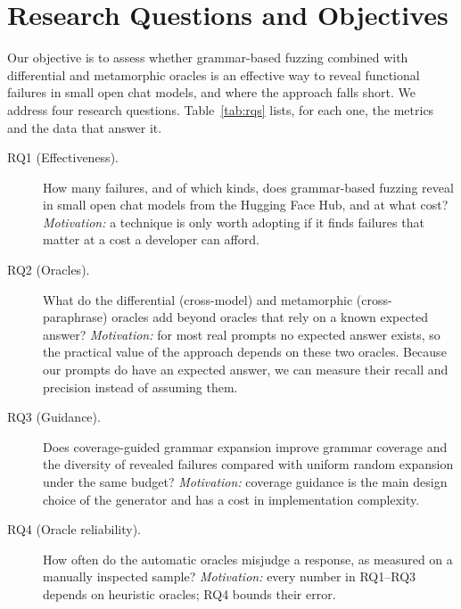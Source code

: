 \section{Research Questions and Objectives}\label{sec:rqs}

Our objective is to assess whether grammar-based fuzzing combined with differential and metamorphic oracles is an effective way to reveal functional failures in small open chat models, and where the approach falls short. We address four research questions. Table~\ref{tab:rqs} lists, for each one, the metrics and the data that answer it.

\begin{description}
  \item[RQ1 (Effectiveness).] How many failures, and of which kinds, does grammar-based fuzzing reveal in small open chat models from the Hugging Face Hub, and at what cost? \emph{Motivation:} a technique is only worth adopting if it finds failures that matter at a cost a developer can afford.
  \item[RQ2 (Oracles).] What do the differential (cross-model) and metamorphic (cross-paraphrase) oracles add beyond oracles that rely on a known expected answer? \emph{Motivation:} for most real prompts no expected answer exists, so the practical value of the approach depends on these two oracles. Because our prompts do have an expected answer, we can measure their recall and precision instead of assuming them.
  \item[RQ3 (Guidance).] Does coverage-guided grammar expansion improve grammar coverage and the diversity of revealed failures compared with uniform random expansion under the same budget? \emph{Motivation:} coverage guidance is the main design choice of the generator and has a cost in implementation complexity.
  \item[RQ4 (Oracle reliability).] How often do the automatic oracles misjudge a response, as measured on a manually inspected sample? \emph{Motivation:} every number in RQ1--RQ3 depends on heuristic oracles; RQ4 bounds their error.
\end{description}

